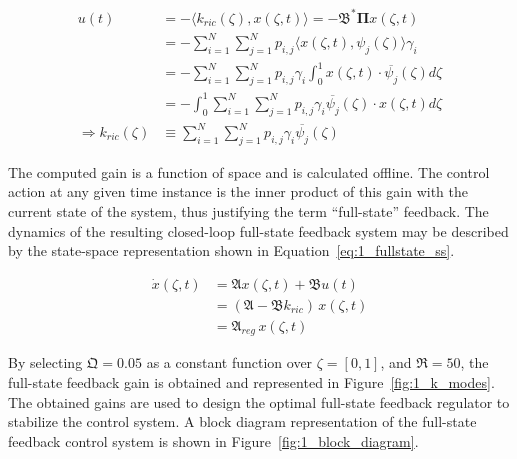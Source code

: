 \begin{equation} \label{eq:1_fullstate_gain}
    \begin{aligned}
        u(t) &= - \langle k_{ric}(\zeta), {x}(\zeta, t) \rangle = - \mathfrak{B}^* \mathbf{\Pi} {x}(\zeta, t) \\
        &= - \sum_{i=1}^N\sum_{j=1}^N p_{i,j} \langle {x}(\zeta, t), {\psi_j}(\zeta) \rangle \gamma_i \\
        &= - \sum_{i=1}^N\sum_{j=1}^N p_{i,j} \gamma_i \int_0^1 {x}(\zeta, t) \cdot \overline{{\psi_j}}(\zeta) d\zeta \\
        &= - \int_0^1 \sum_{i=1}^N\sum_{j=1}^N p_{i,j} \gamma_i \overline{{\psi_j}}(\zeta) \cdot {x}(\zeta, t) d\zeta \\
        \Rightarrow k_{ric}(\zeta) &\equiv \sum_{i=1}^N\sum_{j=1}^N p_{i,j} \gamma_i \overline{{\psi_j}}(\zeta)
    \end{aligned}
\end{equation}

The computed gain is a function of space and is calculated offline. The control action at any given time instance is the inner product of this gain with the current state of the system, thus justifying the term ``full-state'' feedback. The dynamics of the resulting closed-loop full-state feedback system may be described by the state-space representation shown in Equation~\ref{eq:1_fullstate_ss}.

\begin{equation}
    \begin{aligned} \label{eq:1_fullstate_ss}
        \dot{x}(\zeta, t) &= \mathfrak{A} {x}(\zeta, t) + \mathfrak{B} u(t) \\
        &= (\mathfrak{A} - \mathfrak{B} k_{ric}) \, {x}(\zeta, t) \\
        &= \mathfrak{A}_{reg} \, {x}(\zeta, t)
    \end{aligned}
\end{equation}

By selecting $\mathfrak{Q} = 0.05$ as a constant function over $\zeta = [0,1]$, and $\mathfrak{R} = 50$, the full-state feedback gain is obtained and represented in Figure~\ref{fig:1_k_modes}. The obtained gains are used to design the optimal full-state feedback regulator to stabilize the control system. A block diagram representation of the full-state feedback control system is shown in Figure~\ref{fig:1_block_diagram}.

